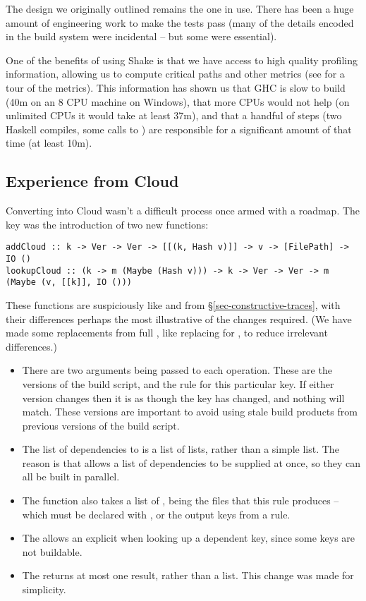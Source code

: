 The design we originally outlined remains the one in use. There has been a huge amount of engineering work to make the tests pass (many of the details encoded in the \Make build system were incidental -- but some were essential).

One of the benefits of using Shake is that we have access to high quality profiling information, allowing us to compute critical paths and other metrics (see \cite{mitchell2019ghcrebuildtimes} for a tour of the metrics). This information has shown us that GHC is slow to build (40m on an 8 CPU machine on Windows), that more CPUs would not help (on unlimited CPUs it would take at least 37m), and that a handful of steps (two Haskell compiles, some calls to ) are responsible for a significant amount of that time (at least 10m).

\subsection{Experience from Cloud \Shake}\label{sec-cloud-shake}

Converting \Shake into Cloud \Shake wasn't a difficult process once armed with a roadmap. The key was the introduction of two new functions:

\begin{verbatim}
addCloud :: k -> Ver -> Ver -> [[(k, Hash v)]] -> v -> [FilePath] -> IO ()
lookupCloud :: (k -> m (Maybe (Hash v))) -> k -> Ver -> Ver -> m (Maybe (v, [[k]], IO ()))
\end{verbatim}

These functions are suspiciously like  and  from \S\ref{sec-constructive-traces}, with their differences perhaps the most illustrative of the changes required. (We have made some replacements from full \Shake, like replacing  for , to reduce irrelevant differences.)

\begin{itemize}
\item There are two  arguments being passed to each operation. These are the versions of the build script, and the rule for this particular key. If either version changes then it is as though the key has changed, and nothing will match. These versions are important to avoid using stale build products from previous versions of the build script.
\item The list of dependencies to  is a list of lists, rather than a simple list. The reason is that \Shake allows a list of dependencies to be supplied at once, so they can all be built in parallel.
\item The  function also takes a list of , being the files that this rule produces -- which must be declared with , or the output keys from a rule.
\item The  allows an explicit  when looking up a dependent key, since some keys are not buildable.
\item The  returns at most one result, rather than a list. This change was made for simplicity.
\end{itemize}

